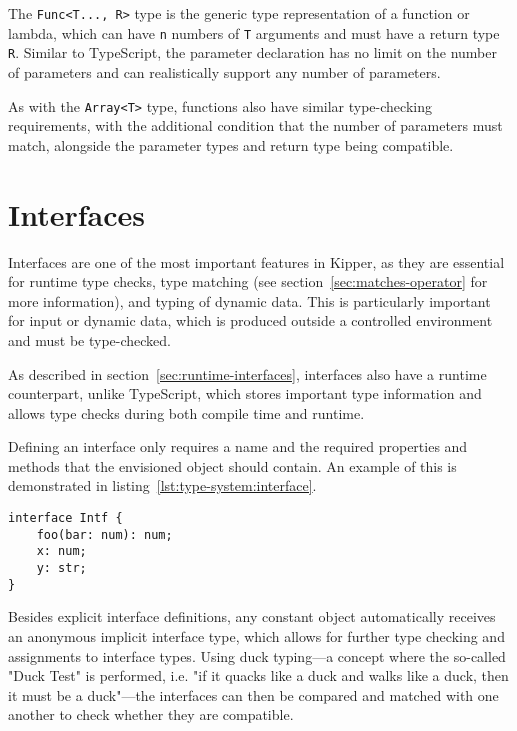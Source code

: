 The \lstinline|Func<T..., R>| type is the generic type representation of a function or lambda, which can have \lstinline|n| numbers of \lstinline|T| arguments and must have a return type \lstinline|R|. Similar to TypeScript, the parameter declaration has no limit on the number of parameters and can realistically support any number of parameters.

As with the \lstinline|Array<T>| type, functions also have similar type-checking requirements, with the additional condition that the number of parameters must match, alongside the parameter types and return type being compatible.

\section{Interfaces}
\label{sec:kipper-interfaces}

Interfaces are one of the most important features in Kipper, as they are essential for runtime type checks, type matching (see section~\ref{sec:matches-operator} for more information), and typing of dynamic data. This is particularly important for input or dynamic data, which is produced outside a controlled environment and must be type-checked.

As described in section~\ref{sec:runtime-interfaces}, interfaces also have a runtime counterpart, unlike TypeScript, which stores important type information and allows type checks during both compile time and runtime.

Defining an interface only requires a name and the required properties and methods that the envisioned object should contain. An example of this is demonstrated in listing~\ref{lst:type-system:interface}.

\begin{lstlisting}[language=Kipper,caption=The definition of a simple interface with a method and properties,label=lst:type-system:interface]
interface Intf {
	foo(bar: num): num;
	x: num;
	y: str;
}
\end{lstlisting}

Besides explicit interface definitions, any constant object automatically receives an anonymous implicit interface type, which allows for further type checking and assignments to interface types. Using duck typing—a concept where the so-called "Duck Test" is performed, i.e. "if it quacks like a duck and walks like a duck, then it must be a duck"—the interfaces can then be compared and matched with one another to check whether they are compatible.

